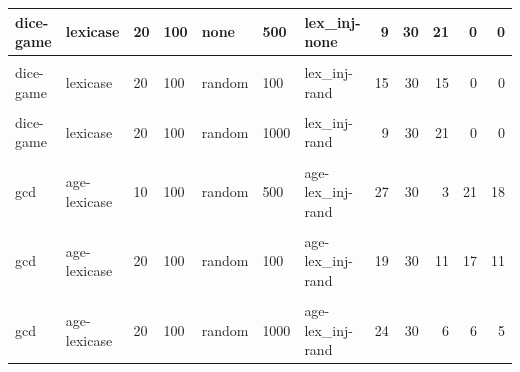\documentclass[
]{book}
\begin{document}
\begin{table}
\begin{tabular}{l|l|l|l|l|l|l|r|r|r|r|r}
\hline
dice-game & lexicase & 20 & 100 & none & 500 & lex\_inj-none & 9 & 30 & 21 & 0 & 0\\
\hline
\cellcolor{gray!6}{dice-game} & \cellcolor{gray!6}{lexicase} & \cellcolor{gray!6}{20} & \cellcolor{gray!6}{100} & \cellcolor{gray!6}{none} & \cellcolor{gray!6}{1000} & \cellcolor{gray!6}{lex\_inj-none} & \cellcolor{gray!6}{14} & \cellcolor{gray!6}{30} & \cellcolor{gray!6}{16} & \cellcolor{gray!6}{0} & \cellcolor{gray!6}{0}\\
\hline
dice-game & lexicase & 20 & 100 & random & 100 & lex\_inj-rand & 15 & 30 & 15 & 0 & 0\\
\hline
\cellcolor{gray!6}{dice-game} & \cellcolor{gray!6}{lexicase} & \cellcolor{gray!6}{20} & \cellcolor{gray!6}{100} & \cellcolor{gray!6}{random} & \cellcolor{gray!6}{500} & \cellcolor{gray!6}{lex\_inj-rand} & \cellcolor{gray!6}{15} & \cellcolor{gray!6}{30} & \cellcolor{gray!6}{15} & \cellcolor{gray!6}{0} & \cellcolor{gray!6}{0}\\
\hline
dice-game & lexicase & 20 & 100 & random & 1000 & lex\_inj-rand & 9 & 30 & 21 & 0 & 0\\
\hline
\cellcolor{gray!6}{gcd} & \cellcolor{gray!6}{age-lexicase} & \cellcolor{gray!6}{10} & \cellcolor{gray!6}{100} & \cellcolor{gray!6}{random} & \cellcolor{gray!6}{100} & \cellcolor{gray!6}{age-lex\_inj-rand} & \cellcolor{gray!6}{19} & \cellcolor{gray!6}{30} & \cellcolor{gray!6}{11} & \cellcolor{gray!6}{29} & \cellcolor{gray!6}{18}\\
\hline
gcd & age-lexicase & 10 & 100 & random & 500 & age-lex\_inj-rand & 27 & 30 & 3 & 21 & 18\\
\hline
\cellcolor{gray!6}{gcd} & \cellcolor{gray!6}{age-lexicase} & \cellcolor{gray!6}{10} & \cellcolor{gray!6}{100} & \cellcolor{gray!6}{random} & \cellcolor{gray!6}{1000} & \cellcolor{gray!6}{age-lex\_inj-rand} & \cellcolor{gray!6}{24} & \cellcolor{gray!6}{30} & \cellcolor{gray!6}{6} & \cellcolor{gray!6}{17} & \cellcolor{gray!6}{13}\\
\hline
gcd & age-lexicase & 20 & 100 & random & 100 & age-lex\_inj-rand & 19 & 30 & 11 & 17 & 11\\
\hline
\cellcolor{gray!6}{gcd} & \cellcolor{gray!6}{age-lexicase} & \cellcolor{gray!6}{20} & \cellcolor{gray!6}{100} & \cellcolor{gray!6}{random} & \cellcolor{gray!6}{500} & \cellcolor{gray!6}{age-lex\_inj-rand} & \cellcolor{gray!6}{20} & \cellcolor{gray!6}{30} & \cellcolor{gray!6}{10} & \cellcolor{gray!6}{7} & \cellcolor{gray!6}{5}\\
\hline
gcd & age-lexicase & 20 & 100 & random & 1000 & age-lex\_inj-rand & 24 & 30 & 6 & 6 & 5\\

\end{tabular}
\end{table}
\end{document}
